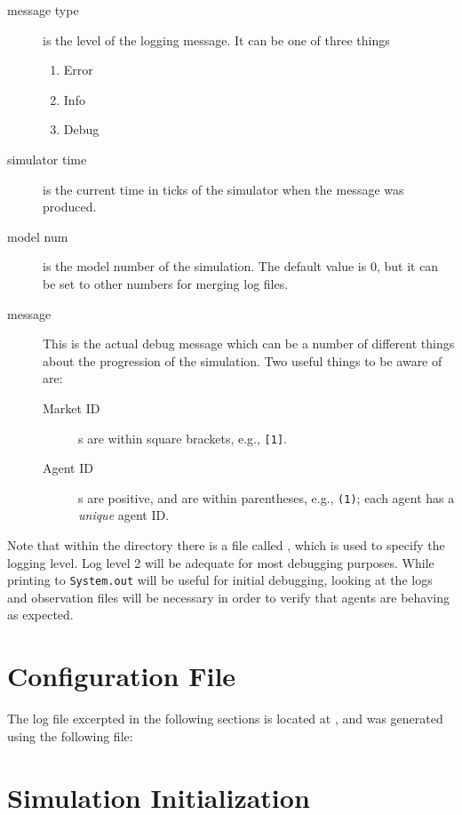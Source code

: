 \documentclass[11pt]{article}
\newcommand{\simspec}{simulation_spec.json}
\begin{document}
\begin{description}
\item[message type] is the level of the logging message. It can be one of three things
  \begin{enumerate}[1)]
    \item Error
    \item Info
    \item Debug
  \end{enumerate}
\item[simulator time] is the current time in ticks of the simulator when the
  message was produced.
\item[model num] is the model number of the simulation. The default value
  is 0, but it can be set to other numbers for merging log files.
\item[message] This is the actual debug message which can be a number of
  different things about the progression of the simulation. Two useful things to
  be aware of are:
  \begin{description}
  \item[Market ID]s are within square brackets, e.g., \texttt{[1]}.
  \item[Agent ID]s are positive, and are within parentheses, e.g., \texttt{(1)};
    each agent has a \emph{unique} agent ID.
  \end{description}
\end{description}

Note that within the  directory there is a file called
, which is used to specify the logging level. Log level 2
will be adequate for most debugging purposes.
%
While printing to \texttt{System.out} will be useful for initial debugging,
looking at the logs and observation files will be necessary in order to verify
that agents are behaving as expected.

\section{Configuration File}

The log file excerpted in the following sections is located at
, and was generated using the
following  file:



\section{Simulation Initialization}
\end{document}
